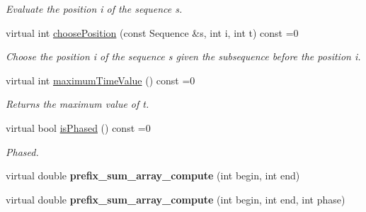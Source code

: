 \begin{DoxyCompactItemize}
\begin{DoxyCompactList}\small\item\em Evaluate the position i of the sequence s. \end{DoxyCompactList}\item 
virtual int \hyperlink{classtops_1_1InhomogeneousFactorableModel_ab5cba15522b91a4036e6966f774e9989}{choose\+Position} (const Sequence \&s, int i, int t) const =0
\begin{DoxyCompactList}\small\item\em Choose the position i of the sequence s given the subsequence before the position i. \end{DoxyCompactList}\item 
\mbox{\label{classtops_1_1InhomogeneousFactorableModel_a74326afb0110bdebb579fe2d9024d9e9}} 
virtual int \hyperlink{classtops_1_1InhomogeneousFactorableModel_a74326afb0110bdebb579fe2d9024d9e9}{maximum\+Time\+Value} () const =0
\begin{DoxyCompactList}\small\item\em Returns the maximum value of t. \end{DoxyCompactList}\item 
\mbox{\label{classtops_1_1InhomogeneousFactorableModel_a403fbd005d03fcfcef1fca4c98068b39}} 
virtual bool \hyperlink{classtops_1_1InhomogeneousFactorableModel_a403fbd005d03fcfcef1fca4c98068b39}{is\+Phased} () const =0
\begin{DoxyCompactList}\small\item\em Phased. \end{DoxyCompactList}\item 
\mbox{\label{classtops_1_1InhomogeneousFactorableModel_a2ba1c4308be601cdde635e839f7f0b21}} 
virtual double {\bfseries prefix\+\_\+sum\+\_\+array\+\_\+compute} (int begin, int end)
\item 
\mbox{\label{classtops_1_1InhomogeneousFactorableModel_a16cfe72f4fca1a22836e75b260486c94}} 
virtual double {\bfseries prefix\+\_\+sum\+\_\+array\+\_\+compute} (int begin, int end, int phase)
\item 
\mbox{\label{classtops_1_1InhomogeneousFactorableModel_a1f98315d7b7ca5a4e6f50c177cae6e8d}} 

\end{DoxyCompactItemize}
